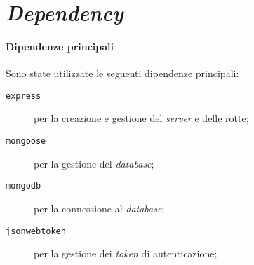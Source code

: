 \section{\textit{Dependency}}
    \paragraph{Dipendenze principali} Sono state utilizzate le seguenti dipendenze principali:
    \begin{description}
        \item[\texttt{express}] per la creazione e gestione del \textit{server} e delle rotte;
        \item[\texttt{mongoose}] per la gestione del \textit{database};
        \item[\texttt{mongodb}] per la connessione al \textit{database};
        \item[\texttt{jsonwebtoken}] per la gestione dei \textit{token} di autenticazione;
    \end{description}
